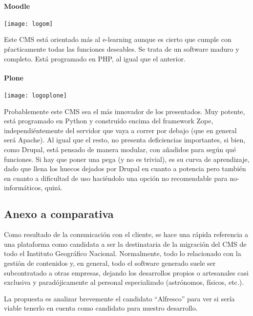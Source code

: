 \paragraph{Moodle}
\texttt{[image: logom]}
\par Este CMS está orientado más al e-learning aunque es cierto que cumple con pŕacticamente todas las funciones deseables.
Se trata de un software maduro y completo.
Está programado en PHP, al igual que el anterior.

\paragraph{Plone}
\texttt{[image: logoplone]}
\par Probablemente este CMS sea el más innovador de los presentados. Muy potente, está programado en Python y construído encima del framework Zope, independiéntemente del servidor que vaya a correr por debajo (que en general será Apache).
Al igual que el resto, no presenta deficiencias importantes, si bien, como Drupal, está pensado de manera modular, con añadidos para según qué funciones.
Si hay que poner una pega (y no es trivial), es su curva de aprendizaje, dado que llena los huecos dejados por Drupal en cuanto a potencia pero también en cuanto a dificultad de uso haciéndolo una opción no recomendable para no-informáticos, quizá.

\subsection{Anexo a comparativa}
\par Como resultado de la comunicación con el cliente, se hace una rápida referencia a una plataforma como candidata a ser la destinataria de la migración del CMS de todo el Instituto Geográfico Nacional. Normalmente, todo lo relacionado con la gestión de contenidos y, en general, todo el software generado suele ser subcontratado a otras empresas, dejando los desarrollos propios o artesanales casi exclusiva y paradójicamente al personal especializado (astrónomos, físicos, etc.).
\par La propuesta es analizar brevemente el candidato ``Alfresco'' para ver si sería viable tenerlo en cuenta como candidato para nuestro desarrollo.
